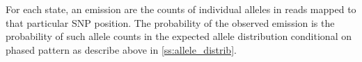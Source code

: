 For each state, an emission are the counts of individual alleles in reads mapped to that particular SNP position. The probability of the observed emission is the probability of such allele counts in the expected allele distribution conditional on phased pattern as describe above in \ref{ss:allele_distrib}.


\begin{figure}[h]
\centering
{}
\hspace{20pt}
\end{figure}
